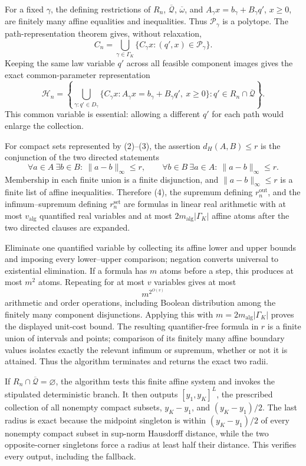 For a fixed \(\gamma\), the defining restrictions of \(R_n\), \(\overline{\mathcal Q}\), \(\overline\omega\), and \(A_\gamma x=b_\gamma+B_\gamma q'\), \(x\ge0\), are finitely many affine equalities and inequalities.  Thus \(\mathcal P_\gamma\) is a polytope.  The path-representation theorem gives, without relaxation,
\[
C_n=\bigcup_{\gamma\in\Gamma_K}
\{C_\gamma x:(q',x)\in\mathcal P_\gamma\}.
\tag{2}
\]
Keeping the same law variable \(q'\) across all feasible component images gives the exact common-parameter representation
\[
\mathcal H_n
=\left\{
\bigcup_{\gamma:q'\in D_\gamma}\{C_\gamma x:A_\gamma x=b_\gamma+B_\gamma q',\ x\ge0\}:
q'\in R_n\cap\overline{\mathcal Q}
\right\}.
\tag{3}
\]
This common variable is essential: allowing a different \(q'\) for each path would enlarge the collection.

For compact sets represented by (2)--(3), the assertion \(d_H(A,B)\le r\) is the conjunction of the two directed statements
\[
\forall a\in A\ \exists b\in B:\ \|a-b\|_\infty\le r,
\qquad
\forall b\in B\ \exists a\in A:\ \|a-b\|_\infty\le r.
\tag{4}
\]
Membership in each finite union is a finite disjunction, and \(\|a-b\|_\infty\le r\) is a finite list of affine inequalities.  Therefore (4), the supremum defining \(r_n^{\mathrm{out}}\), and the infimum--supremum defining \(r_n^{\mathrm{set}}\) are formulas in linear real arithmetic with at most \(v_{\mathrm{alg}}\) quantified real variables and at most \(2m_{\mathrm{alg}}|\Gamma_K|\) affine atoms after the two directed clauses are expanded.

Eliminate one quantified variable by collecting its affine lower and upper bounds and imposing every lower--upper comparison; negation converts universal to existential elimination.  If a formula has \(m\) atoms before a step, this produces at most \(m^2\) atoms.  Repeating for at most \(v\) variables gives at most
\[
m^{2^{O(v)}}
\]
arithmetic and order operations, including Boolean distribution among the finitely many component disjunctions.  Applying this with \(m=2m_{\mathrm{alg}}|\Gamma_K|\) proves the displayed unit-cost bound.  The resulting quantifier-free formula in \(r\) is a finite union of intervals and points; comparison of its finitely many affine boundary values isolates exactly the relevant infimum or supremum, whether or not it is attained.  Thus the algorithm terminates and returns the exact two radii.

If \(R_n\cap\overline{\mathcal Q}=\varnothing\), the algorithm tests this finite affine system and invokes the stipulated deterministic branch.  It then outputs \([y_1,y_K]^L\), the prescribed collection of all nonempty compact subsets, \(y_K-y_1\), and \((y_K-y_1)/2\).  The last radius is exact because the midpoint singleton is within \((y_K-y_1)/2\) of every nonempty compact subset in sup-norm Hausdorff distance, while the two opposite-corner singletons force a radius at least half their distance.  This verifies every output, including the fallback.

